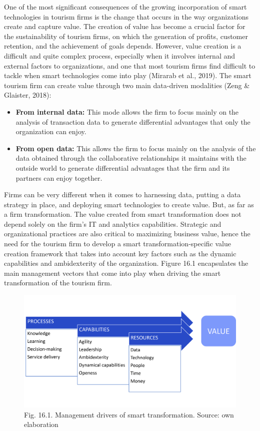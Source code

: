 \documentclass[
  letterpaper,
  DIV=11,
  numbers=noendperiod]{scrreprt}
\begin{document}
One of the most significant consequences of the growing incorporation of
smart technologies in tourism firms is the change that occurs in the way
organizations create and capture value. The creation of value has become
a crucial factor for the sustainability of tourism firms, on which the
generation of profits, customer retention, and the achievement of goals
depends. However, value creation is a difficult and quite complex
process, especially when it involves internal and external factors to
organizations, and one that most tourism firms find difficult to tackle
when smart technologies come into play (Mirarab et al., 2019). The smart
tourism firm can create value through two main data-driven modalities
(Zeng \& Glaister, 2018):

\begin{itemize}
\item
  \textbf{From internal data:} This mode allows the firm to focus mainly
  on the analysis of transaction data to generate differential
  advantages that only the organization can enjoy.
\item
  \textbf{From open data:} This allows the firm to focus mainly on the
  analysis of the data obtained through the collaborative relationships
  it maintains with the outside world to generate differential
  advantages that the firm and its partners can enjoy together.
\end{itemize}

Firms can be very different when it comes to harnessing data, putting a
data strategy in place, and deploying smart technologies to create
value. But, as far as a firm transformation. The value created from
smart transformation does not depend solely on the firm's IT and
analytics capabilities. Strategic and organizational practices are also
critical to maximizing business value, hence the need for the tourism
firm to develop a smart transformation-specific value creation framework
that takes into account key factors such as the dynamic capabilities and
ambidexterity of the organization. Figure 16.1 encapsulates the main
management vectors that come into play when driving the smart
transformation of the tourism firm.

\begin{figure}

{\centering \includegraphics{img/fig25.png}

}

\caption{Fig. 16.1. Management drivers of smart transformation. Source:
own elaboration}

\end{figure}
\end{document}
